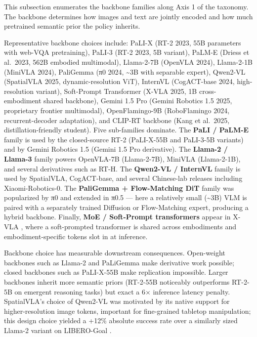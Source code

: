 \documentclass{article}
\begin{document}
This subsection enumerates the backbone families along Axis 1 of the taxonomy. The backbone determines how images and text are jointly encoded and how much pretrained semantic prior the policy inherits.

Representative backbone choices include: PaLI-X (RT-2 2023, 55B parameters with web-VQA pretraining), PaLI-3 (RT-2 2023, 5B variant), PaLM-E (Driess et al.~2023, 562B embodied multimodal), Llama-2-7B (OpenVLA 2024), Llama-2-1B (MiniVLA 2024), PaliGemma (π0 2024, \textasciitilde3B with separable expert), Qwen2-VL (SpatialVLA 2025, dynamic-resolution ViT), InternVL (CogACT-base 2024, high-resolution variant), Soft-Prompt Transformer (X-VLA 2025, 1B cross-embodiment shared backbone), Gemini 1.5 Pro (Gemini Robotics 1.5 2025, proprietary frontier multimodal), OpenFlamingo-9B (RoboFlamingo 2024, recurrent-decoder adaptation), and CLIP-RT backbone (Kang et al.~2025, distillation-friendly student). Five sub-families dominate. The \textbf{PaLI / PaLM-E} family is used by the closed-source RT-2 (PaLI-X-55B and PaLI-3-5B variants) and by Gemini Robotics 1.5 (Gemini 1.5 Pro derivative). The \textbf{Llama-2 / Llama-3} family powers OpenVLA-7B (Llama-2-7B), MiniVLA (Llama-2-1B), and several derivatives such as RT-H. The \textbf{Qwen2-VL / InternVL} family is used by SpatialVLA, CogACT-base, and several Chinese-lab releases including Xiaomi-Robotics-0. The \textbf{PaliGemma + Flow-Matching DiT} family was popularized by π0 and extended in π0.5 --- here a relatively small (\textasciitilde3B) VLM is paired with a separately trained Diffusion or Flow-Matching expert, producing a hybrid backbone. Finally, \textbf{MoE / Soft-Prompt transformers} appear in X-VLA \cite{zheng2025xvlasoftpromptedtr}, where a soft-prompted transformer is shared across embodiments and embodiment-specific tokens slot in at inference.

Backbone choice has measurable downstream consequences. Open-weight backbones such as Llama-2 and PaLiGemma make derivative work possible; closed backbones such as PaLI-X-55B make replication impossible. Larger backbones inherit more semantic priors (RT-2-55B noticeably outperforms RT-2-5B on emergent reasoning tasks) but exact a 6× inference latency penalty. SpatialVLA's choice of Qwen2-VL was motivated by its native support for higher-resolution image tokens, important for fine-grained tabletop manipulation; this design choice yielded a +12\% absolute success rate over a similarly sized Llama-2 variant on LIBERO-Goal \cite{qu2025spatialvlaexplorin}.
\end{document}
